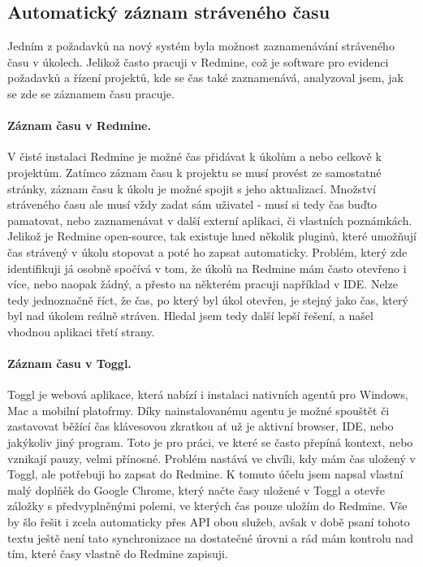 
\subsection{Automatický záznam stráveného času}\label{implementation:time_tracking}

Jedním z požadavků na nový systém byla možnost zaznamenávání stráveného času v úkolech. Jelikož často pracuji v Redmine, což je software pro evidenci požadavků a řízení projektů, kde se čas také zaznamenává, analyzoval jsem, jak se zde se záznamem času pracuje.

\paragraph{Záznam času v Redmine.} V čisté instalaci Redmine je možné čas přidávat k úkolům a nebo celkově k projektům. Zatímco záznam času k projektu se musí provést ze samostatné stránky, záznam času k úkolu je možné spojit s jeho aktualizací. Množství stráveného času ale musí vždy zadat sám uživatel - musí si tedy čas buďto pamatovat, nebo zaznamenávat v další externí aplikaci, či vlastních poznámkách. Jelikož je Redmine open-source, tak existuje hned několik pluginů, které umožňují čas strávený v úkolu stopovat a poté ho zapsat automaticky. Problém, který zde identifikuji já osobně spočívá v tom, že úkolů na Redmine mám často otevřeno i více, nebo naopak žádný, a přesto na některém pracuji například v IDE. Nelze tedy jednoznačně říct, že čas, po který byl úkol otevřen, je stejný jako čas, který byl nad úkolem reálně stráven. Hledal jsem tedy další lepší řešení, a našel vhodnou aplikaci třetí strany.

\paragraph{Záznam času v Toggl.} Toggl je webová aplikace, která nabízí i instalaci nativních agentů pro Windows, Mac a mobilní platofrmy. Díky nainstalovanému agentu je možné spouštět či zastavovat běžící čas klávesovou zkratkou ať už je aktivní browser, IDE, nebo jakýkoliv jiný program. Toto je pro práci, ve které se často přepíná kontext, nebo vznikají pauzy, velmi přínosné. Problém nastává ve chvíli, kdy mám čas uložený v Toggl, ale potřebuji ho zapsat do Redmine. K tomuto účelu jsem napsal vlastní malý doplňěk do Google Chrome, který načte časy uložené v Toggl a otevře záložky s předvyplněnými polemi, ve kterých čas pouze uložím do Redmine. Vše by šlo řešit i zcela automaticky přes API obou služeb, avšak v době psaní tohoto textu ještě není tato synchronizace na dostatečné úrovni a rád mám kontrolu nad tím, které časy vlastně do Redmine zapisuji.

